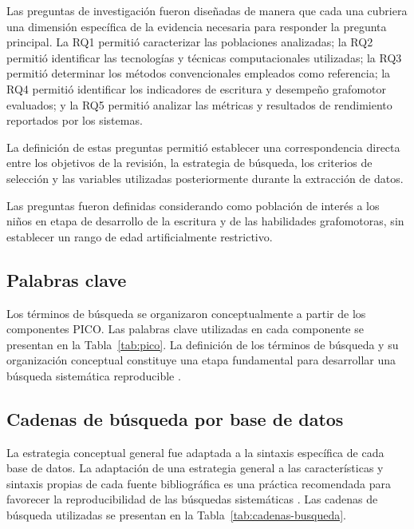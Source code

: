 \documentclass{iaesarticle}
\begin{document}
\vspace{0.5em}

Las preguntas de investigación fueron diseñadas de manera que cada una cubriera una dimensión específica de la evidencia necesaria para responder la pregunta principal. La RQ1 permitió caracterizar las poblaciones analizadas; la RQ2 permitió identificar las tecnologías y técnicas computacionales utilizadas; la RQ3 permitió determinar los métodos convencionales empleados como referencia; la RQ4 permitió identificar los indicadores de escritura y desempeño grafomotor evaluados; y la RQ5 permitió analizar las métricas y resultados de rendimiento reportados por los sistemas.

La definición de estas preguntas permitió establecer una correspondencia directa entre los objetivos de la revisión, la estrategia de búsqueda, los criterios de selección y las variables utilizadas posteriormente durante la extracción de datos.

Las preguntas fueron definidas considerando como población de interés a los niños en etapa de desarrollo de la escritura y de las habilidades grafomotoras, sin establecer un rango de edad artificialmente restrictivo.

\subsection{Palabras clave}

Los términos de búsqueda se organizaron conceptualmente a partir de los componentes PICO. Las palabras clave utilizadas en cada componente se presentan en la Tabla~\ref{tab:pico}. La definición de los términos de búsqueda y su organización conceptual constituye una etapa fundamental para desarrollar una búsqueda sistemática reproducible \cite{rethlefsen2021}.

\subsection{Cadenas de búsqueda por base de datos}

La estrategia conceptual general fue adaptada a la sintaxis específica de cada base de datos. La adaptación de una estrategia general a las características y sintaxis propias de cada fuente bibliográfica es una práctica recomendada para favorecer la reproducibilidad de las búsquedas sistemáticas \cite{rethlefsen2021}. Las cadenas de búsqueda utilizadas se presentan en la Tabla~\ref{tab:cadenas-busqueda}.
\end{document}
